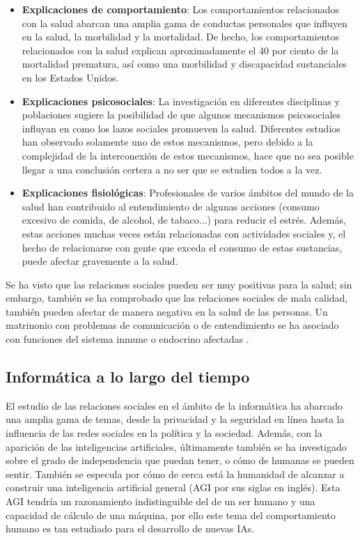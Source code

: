 \begin{itemize}
	\item \textbf{Explicaciones de comportamiento}: 
	Los comportamientos relacionados con la salud abarcan una amplia gama de conductas personales que influyen en la salud, la morbilidad y la mortalidad. De hecho, los comportamientos relacionados con la salud explican aproximadamente el 40 por ciento de la mortalidad prematura, así como una morbilidad y discapacidad sustanciales en los Estados Unidos. \citep{activePolicyAttention}
	
	\item \textbf{Explicaciones psicosociales}: La investigación en diferentes disciplinas y poblaciones sugiere la posibilidad de que algunos mecanismos psicosociales influyan en como los lazos sociales promueven la salud. Diferentes estudios han observado solamente uno de estos mecanismos, pero debido a la complejidad de la interconexión de estos mecanismos, hace que no sea posible llegar a una conclusión certera a no ser que se estudien todos a la vez.
	
	\item \textbf{Explicaciones fisiológicas}: Profesionales de varios ámbitos del mundo de la salud han  contribuido al entendimiento de algunas acciones (consumo excesivo de comida, de alcohol, de tabaco...) para reducir el estrés. Además, estas acciones muchas veces están relacionadas con actividades sociales y, el hecho de relacionarse con gente que exceda el consumo de estas sustancias, puede afectar gravemente a la salud.
	
	
\end{itemize}

Se ha visto que las relaciones sociales pueden ser muy positivas para la salud; sin embargo, también se ha comprobado que las relaciones sociales de mala calidad, también pueden afectar de manera negativa en la salud de las personas. Un matrinonio con problemas de comunicación o de entendimiento se ha asociado con funciones del sistema inmune o endocrino afectadas \citep{doi:10.1177/0265407500171001}.

\subsection{Informática a lo largo del tiempo}

El estudio de las relaciones sociales en el ámbito de la informática ha abarcado una amplia gama de temas, desde la privacidad y la seguridad en línea hasta la influencia de las redes sociales en la política y la sociedad. Además, con la aparición de las inteligencias artificiales, últimamente también se ha investigado sobre el grado de independencia que puedan tener, o cómo de humanas se pueden sentir. También se especula por cómo de cerca está la humanidad de alcanzar a construir una inteligencia artificial general (AGI por sus siglas en inglés). Esta AGI tendría un razonamiento indistinguible del de un ser humano y una capacidad de cálculo de una máquina, por ello este tema del comportamiento humano es tan estudiado para el desarrollo de nuevas IAs.

